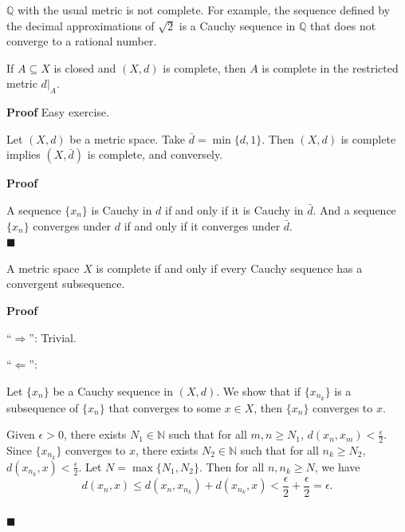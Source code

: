 \documentclass[main.tex]{subfiles}
\begin{document}
\begin{example}
    $\mathbb{Q}$ with the usual metric is not complete. For example, the sequence defined by the decimal approximations of $\sqrt{2}$ is a Cauchy sequence in $\mathbb{Q}$ that does not converge to a rational number.
\end{example}
\begin{property}
    If $A \subseteq X$ is closed and $(X, d)$ is complete, then $A$ is complete in the restricted metric $d|_A$.
\end{property}
\par \noindent \textbf{Proof} Easy exercise.
\begin{property}
    Let $(X, d)$ be a metric space. Take $\bar{d} = \min\{d, 1\}$. Then $(X, d)$ is complete implies $(X, \bar{d})$ is complete, and conversely. 
\end{property}
\par \noindent \textbf{Proof} 
\par A sequence $\{x_n\}$ is Cauchy in $d$ if and only if it is Cauchy in $\bar{d}$. And a sequence $\{x_n\}$ converges under $d$ if and only if it converges under $\bar{d}$. 
\mbox{} \\ \null \hfill $\blacksquare$ 

\begin{lemma}
    A metric space $X$ is complete if and only if every Cauchy sequence has a convergent subsequence.
\end{lemma}
\par \noindent \textbf{Proof} 
\par ``$\Rightarrow$'': Trivial.
\par ``$\Leftarrow$'': 
\par Let $\{x_n\}$ be a Cauchy sequence in $(X, d)$. We show that if $\{x_{n_k}\}$ is a subsequence of $\{x_n\}$ that converges to some $x \in X$, then $\{x_n\}$ converges to $x$.  
\par Given $\epsilon > 0$, there exists $N_1 \in \mathbb{N}$ such that for all $m, n \geq N_1$, $d(x_n, x_m) < \frac{\epsilon}{2}$. Since $\{x_{n_k}\}$ converges to $x$, there exists $N_2 \in \mathbb{N}$ such that for all $n_k \geq N_2$, $d(x_{n_k}, x) < \frac{\epsilon}{2}$. Let $N = \max\{N_1, N_2\}$. Then for all $n, n_k \geq N$, we have 
\begin{equation}
    d(x_n, x) \leq d(x_n, x_{n_k}) + d(x_{n_k}, x) < \frac{\epsilon}{2} + \frac{\epsilon}{2} = \epsilon.
\end{equation}
\mbox{} \\ \null \hfill $\blacksquare$ 
\end{document}
